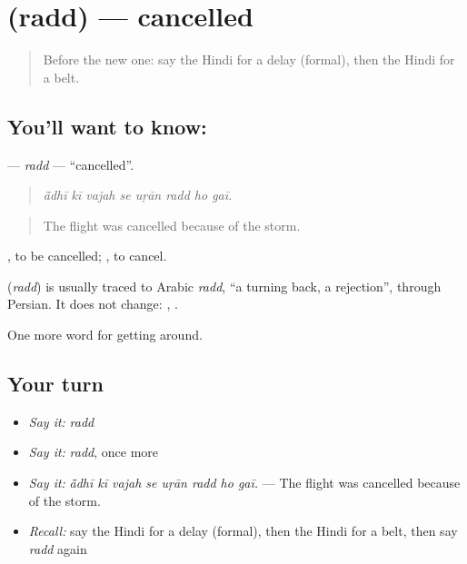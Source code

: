 \section[\texorpdfstring{\hi{रद्द} (radd)}{रद्द (radd)}]{ (radd) — cancelled}

\label{lesson:HI-C411-radd}



\begin{quote}
Before the new one: say the Hindi for a delay (formal), then the Hindi for a belt.
\end{quote}

\subsection*{You'll want to know: }
\textbf{} — \emph{radd} — \textquotedblleft{}cancelled\textquotedblright{}.

\begin{quote}
       
\end{quote}

\begin{quote}
\emph{ā̃dhī kī vajah se uṛān radd ho gaī.}
\end{quote}

\begin{quote}
The flight was cancelled because of the storm.
\end{quote}

 , to be cancelled;  , to cancel.

\begin{cousinweb}
\textbf{} (\emph{radd}) is usually traced to Arabic \emph{radd}, \textquotedblleft{}a turning back, a rejection\textquotedblright{}, through Persian. It does not change:   ,   .
\end{cousinweb}

\begin{grammarlens}[title={What you've built}]
One more word for getting around.
\end{grammarlens}

\subsection*{Your turn}
\begin{itemize}
\raggedright
  \item \emph{Say it:} \emph{radd}
  \item \emph{Say it:} \emph{radd}, once more
  \item \emph{Say it:} \emph{ā̃dhī kī vajah se uṛān radd ho gaī.} — The flight was cancelled because of the storm.
  \item \emph{Recall:} say the Hindi for a delay (formal), then the Hindi for a belt, then say \emph{radd} again
\end{itemize}

